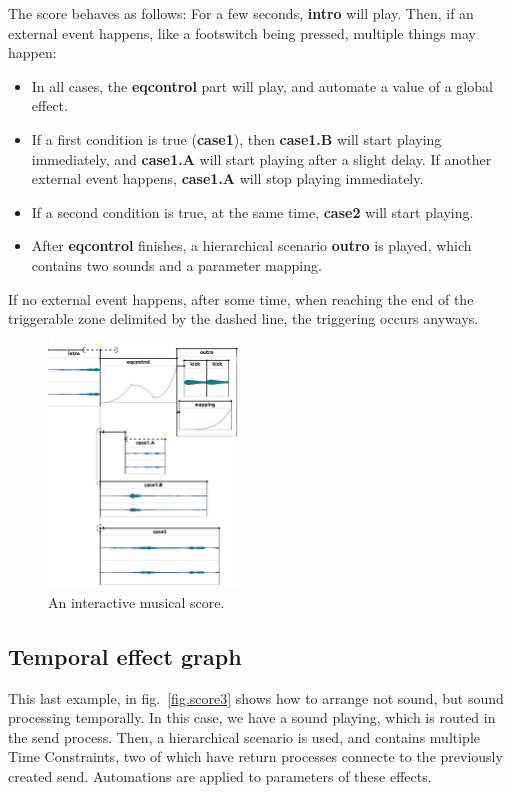 \documentclass{article}
\begin{document}
The score behaves as follows: 
For a few seconds, \textbf{intro} will play.  
Then, if an external event happens, like a footswitch being pressed, 
multiple things may happen: 
\begin{itemize}
    \item In all cases, the \textbf{eqcontrol} part will play, and automate a value of a global effect.
    \item If a first condition is true (\textbf{case1}), then \textbf{case1.B} will start playing immediately, and \textbf{case1.A} will start playing after a slight delay. If another external event happens, \textbf{case1.A} will stop playing immediately.
    \item If a second condition is true, at the same time, \textbf{case2} will start playing.
    \item After \textbf{eqcontrol} finishes, a hierarchical scenario \textbf{outro} is played, which contains two sounds and a parameter mapping.
\end{itemize}
If no external event happens, after some time, when reaching the end of the triggerable zone delimited by the dashed line, the triggering occurs anyways.

\begin{figure}[h]
    \centering
    \includegraphics[width=0.45\textwidth]{figures/ex2.png}
    \caption{An interactive musical score.}
    \label{fig.score2}
\end{figure}

\subsection{Temporal effect graph}
This last example, in fig.~\ref{fig.score3} shows how to arrange not sound, but sound processing temporally.
In this case, we have a sound playing, which is routed in the send process.
Then, a hierarchical scenario is used, and contains multiple Time Constraints, two of which have return processes connecte to the previously created send.
Automations are applied to parameters of these effects.
\end{document}

